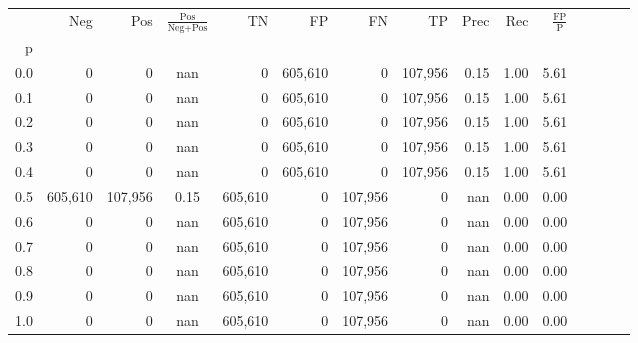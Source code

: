 \begin{tabular}{rrrcrrrrrrrrrrr}
\toprule
{} &      Neg &      Pos & $\frac{\text{Pos}}{\text{Neg}+\text{Pos}}$ &       TN &       FP &       FN &       TP &  Prec &   Rec & $\frac{\text{FP}}{\text{P}}$ \\
p   &          &          &                                            &          &          &          &          &       &       &                              \\
\midrule
0.0 &        0 &        0 &                                        nan &        0 &  605,610 &        0 &  107,956 &  0.15 &  1.00 &                         5.61 \\
0.1 &        0 &        0 &                                        nan &        0 &  605,610 &        0 &  107,956 &  0.15 &  1.00 &                         5.61 \\
0.2 &        0 &        0 &                                        nan &        0 &  605,610 &        0 &  107,956 &  0.15 &  1.00 &                         5.61 \\
0.3 &        0 &        0 &                                        nan &        0 &  605,610 &        0 &  107,956 &  0.15 &  1.00 &                         5.61 \\
0.4 &        0 &        0 &                                        nan &        0 &  605,610 &        0 &  107,956 &  0.15 &  1.00 &                         5.61 \\
0.5 &  605,610 &  107,956 &                                       0.15 &  605,610 &        0 &  107,956 &        0 &   nan &  0.00 &                         0.00 \\
0.6 &        0 &        0 &                                        nan &  605,610 &        0 &  107,956 &        0 &   nan &  0.00 &                         0.00 \\
0.7 &        0 &        0 &                                        nan &  605,610 &        0 &  107,956 &        0 &   nan &  0.00 &                         0.00 \\
0.8 &        0 &        0 &                                        nan &  605,610 &        0 &  107,956 &        0 &   nan &  0.00 &                         0.00 \\
0.9 &        0 &        0 &                                        nan &  605,610 &        0 &  107,956 &        0 &   nan &  0.00 &                         0.00 \\
1.0 &        0 &        0 &                                        nan &  605,610 &        0 &  107,956 &        0 &   nan &  0.00 &                         0.00 \\
\bottomrule
\end{tabular}
